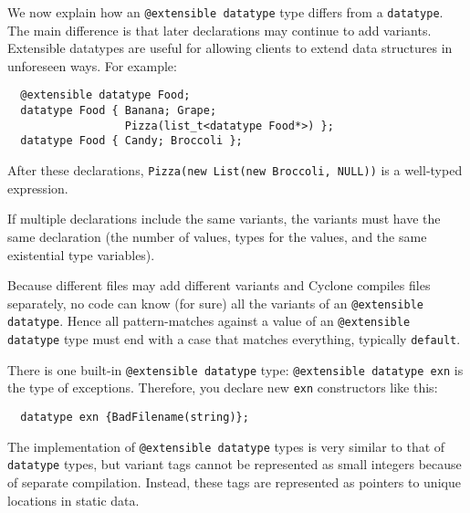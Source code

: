 We now explain how an \texttt{@extensible datatype} type differs 
from a \texttt{datatype}.
The main difference is that later declarations may continue to
add variants.  Extensible datatypes are useful for allowing clients to
extend data structures in unforeseen ways.  For example:
\begin{verbatim}
  @extensible datatype Food;
  datatype Food { Banana; Grape; 
                  Pizza(list_t<datatype Food*>) };
  datatype Food { Candy; Broccoli };
\end{verbatim}

After these declarations, \texttt{Pizza(new List(new Broccoli, NULL))} is a
well-typed expression.

If multiple declarations include the same variants, the variants must
have the same declaration (the number of values, types for the values,
and the same existential type variables).

Because different files may add different variants and Cyclone
compiles files separately, no code can know (for sure) all the
variants of an \texttt{@extensible datatype}. 
Hence all pattern-matches against a
value of an \texttt{@extensible datatype} 
type must end with a case that matches
everything, typically \texttt{default}.

There is one built-in \texttt{@extensible datatype} type: 
\texttt{@extensible datatype exn} is the
type of exceptions.  Therefore, you declare new \texttt{exn}
constructors like this:

\begin{verbatim}
  datatype exn {BadFilename(string)};
\end{verbatim}

The implementation of \texttt{@extensible datatype} 
types is very similar to that of
\texttt{datatype} types, but variant tags cannot be represented as
small integers because of separate compilation.  Instead, these
tags are represented as pointers to unique locations in static
data. 

